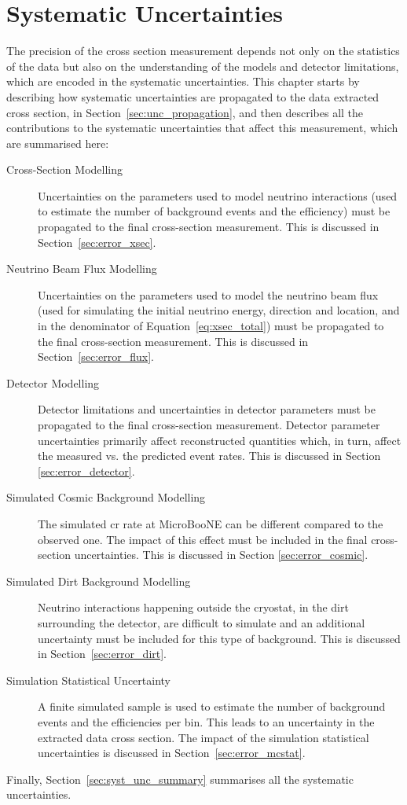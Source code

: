 \chapter{Systematic Uncertainties}
\label{ch:systematics}

The precision of the cross section measurement depends not only on the statistics of the data but also on the understanding of the models and detector limitations, which are encoded in the systematic uncertainties. This chapter starts by describing how systematic uncertainties are propagated to the data extracted cross section, in Section~\ref{sec:unc_propagation}, and then describes all the contributions to the systematic uncertainties that affect this measurement, which are summarised here: 
\begin{description}
\item[Cross-Section Modelling] Uncertainties on the parameters used to model neutrino interactions (used to estimate the number of background events and the efficiency) must be propagated to the final cross-section measurement. This is discussed in Section~\ref{sec:error_xsec}.
\item[Neutrino Beam Flux Modelling] Uncertainties on the parameters used to model the neutrino beam flux (used for simulating the initial neutrino energy, direction and location, and in the denominator of Equation~\eqref{eq:xsec_total}) must be propagated to the final cross-section measurement. This is discussed in Section~\ref{sec:error_flux}.
\item[Detector Modelling] Detector limitations and uncertainties in detector parameters must be propagated to the final cross-section measurement. Detector parameter uncertainties primarily affect reconstructed quantities which, in turn, affect the measured vs. the predicted event rates. This is discussed in Section \ref{sec:error_detector}.
\item[Simulated Cosmic Background Modelling] The simulated \acrshort{cr} rate at MicroBooNE can be different compared to the observed one. The impact of this effect must be included in the final cross-section uncertainties.  This is discussed in Section \ref{sec:error_cosmic}.
\item[Simulated Dirt Background Modelling] Neutrino interactions happening outside the cryostat, in the dirt surrounding the detector, are difficult to simulate and an additional uncertainty must be included for this type of background. This is discussed in Section~\ref{sec:error_dirt}.
\item[Simulation Statistical Uncertainty] A finite simulated sample is used to estimate the number of background events and the efficiencies per bin. This leads to an uncertainty in the extracted data cross section. The impact of the simulation statistical uncertainties is discussed in Section~\ref{sec:error_mcstat}.
\end{description}
Finally, Section~\ref{sec:syst_unc_summary} summarises all the systematic uncertainties.


